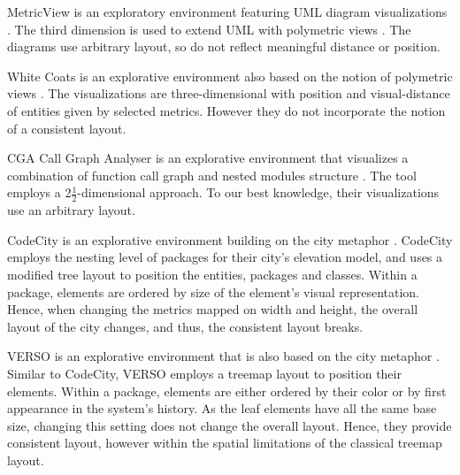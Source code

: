 MetricView is an exploratory environment featuring UML diagram visualizations \cite{Term05a}. The third dimension is used to extend UML with polymetric views \cite{Lanz03d}.
The diagrams use arbitrary layout, so do not reflect meaningful distance or position.

White Coats is an explorative environment also based on the notion of polymetric views \cite{Mesn05b}. The visualizations are three-dimensional with position and visual-distance of entities given by selected metrics. However they do not incorporate the notion of a consistent layout.

CGA Call Graph Analyser is an explorative environment that visualizes a combination of function call graph and nested modules structure \cite{Bohn07a}. The tool employs a 2$\frac{1}{2}$-dimensional approach. To our best knowledge, their visualizations use an arbitrary layout.

CodeCity is an explorative environment building on the city metaphor \cite{Wett07b}. CodeCity employs the nesting level of packages for their city's elevation model, and uses a modified tree layout to position the entities, \ie packages and classes. Within a package, elements are ordered by size of the element's visual representation. Hence, when changing the metrics mapped on width and height, the overall layout of the city changes, and thus, the consistent layout breaks.

VERSO is an explorative environment that is also based on the city metaphor \cite{Lang05a}. Similar to CodeCity, VERSO employs a treemap layout to position their elements. Within a package, elements are either ordered by their color or by first appearance in the system's history. As the leaf elements have all the same base size, changing this setting does not change the overall layout. Hence, they provide consistent layout, however within the spatial limitations of the classical treemap layout. 

